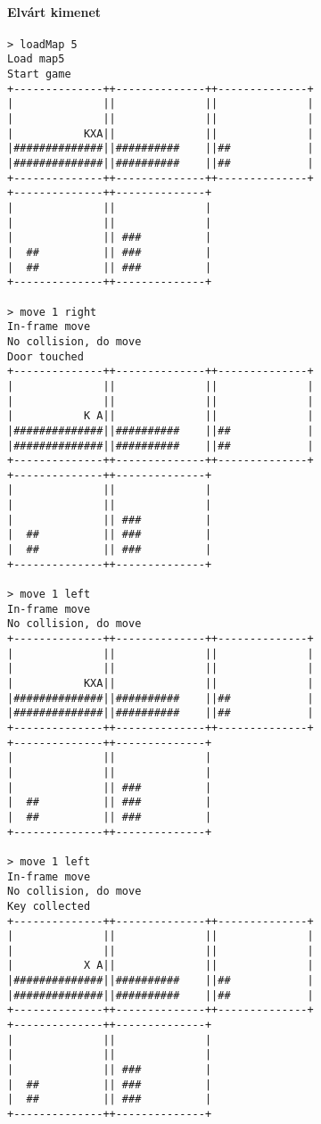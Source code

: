 		        \paragraph*{Elvárt kimenet}
\begin{verbatim}
> loadMap 5
Load map5
Start game
+--------------++--------------++--------------+
|              ||              ||              |
|              ||              ||              |
|           KXA||              ||              |
|##############||##########    ||##            |
|##############||##########    ||##            |
+--------------++--------------++--------------+
+--------------++--------------+                
|              ||              |                
|              ||              |                
|              || ###          |                
|  ##          || ###          |                
|  ##          || ###          |                
+--------------++--------------+                

> move 1 right
In-frame move
No collision, do move
Door touched
+--------------++--------------++--------------+
|              ||              ||              |
|              ||              ||              |
|           K A||              ||              |
|##############||##########    ||##            |
|##############||##########    ||##            |
+--------------++--------------++--------------+
+--------------++--------------+                
|              ||              |                
|              ||              |                
|              || ###          |                
|  ##          || ###          |                
|  ##          || ###          |                
+--------------++--------------+                

> move 1 left
In-frame move
No collision, do move
+--------------++--------------++--------------+
|              ||              ||              |
|              ||              ||              |
|           KXA||              ||              |
|##############||##########    ||##            |
|##############||##########    ||##            |
+--------------++--------------++--------------+
+--------------++--------------+                
|              ||              |                
|              ||              |                
|              || ###          |                
|  ##          || ###          |                
|  ##          || ###          |                
+--------------++--------------+                

> move 1 left
In-frame move
No collision, do move
Key collected
+--------------++--------------++--------------+
|              ||              ||              |
|              ||              ||              |
|           X A||              ||              |
|##############||##########    ||##            |
|##############||##########    ||##            |
+--------------++--------------++--------------+
+--------------++--------------+                
|              ||              |                
|              ||              |                
|              || ###          |                
|  ##          || ###          |                
|  ##          || ###          |                
+--------------++--------------+                


\end{verbatim}
